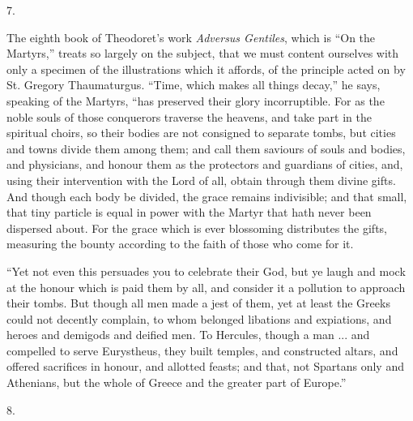 7.

The eighth book of Theodoret's work \emph{Adversus
Gentiles}, which is ``On the Martyrs,'' treats
so largely on the subject, that we must content ourselves
with only a specimen of the illustrations which it
affords, of the principle acted on by St. Gregory
Thaumaturgus. ``Time, which makes all things
decay,'' he says, speaking of the Martyrs, ``has
preserved their glory incorruptible. For as the noble
souls of those conquerors traverse the heavens, and take
part in the spiritual choirs, so their bodies are not
consigned to separate tombs, but cities and towns divide
them among them; and call them saviours of souls and
bodies, and physicians, and honour them as the protectors
and guardians of cities, and, using their intervention
with the Lord of all, obtain through them divine gifts.
And though each body be divided, the grace remains
indivisible; and that small, that tiny particle is equal
in power with the Martyr that hath never been dispersed
about. For the grace which is ever blossoming distributes
the gifts, measuring the bounty according to the faith of
those who come for it.

``Yet not even this persuades you to celebrate
their God, but ye laugh and mock at the honour which is
paid them by all, and consider it a pollution to approach
their tombs. But though all men made a jest of them, yet
at least the Greeks could not decently complain, to whom
belonged libations and expiations, and heroes and
demigods and deified men. To Hercules, though a man ...
and compelled to serve Eurystheus, they built temples,
and constructed altars, and offered sacrifices in honour,
and allotted feasts; and that, not Spartans only and
Athenians, but the whole of Greece and the greater part
of Europe.''

8.

